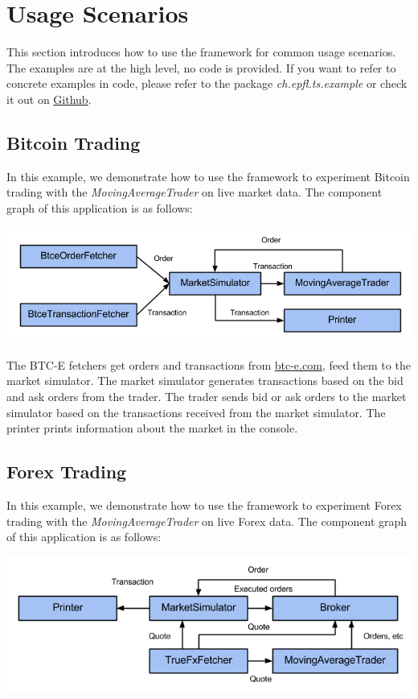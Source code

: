 \section{Usage Scenarios}
\label{sec:3}

This section introduces how to use the framework for common usage scenarios. The examples are at the high level, no code is provided. If you want to refer to concrete examples in code, please refer to the package \emph{ch.epfl.ts.example} or check it out on \href{https://github.com/merlinND/TradingSimulation/tree/master/ts/src/main/scala/ch/epfl/ts/example}{Github}.

\subsection{Bitcoin Trading}

In this example, we demonstrate how to use the framework to experiment Bitcoin trading with the \emph{MovingAverageTrader} on live market data. The component graph of this application is as follows:

\noindent
\includegraphics[width=\textwidth]{img/examples/btce}

The BTC-E fetchers get orders and transactions from \url{btc-e.com}, feed them to the market simulator. The market simulator generates transactions based on the bid and ask orders from the trader. The trader sends bid or ask orders to the market simulator based on the transactions received from the market simulator. The printer prints information about the market in the console.

\subsection{Forex Trading}

In this example, we demonstrate how to use the framework to experiment Forex trading with the \emph{MovingAverageTrader} on live Forex data. The component graph of this application is as follows:

\noindent
\includegraphics[width=\textwidth]{img/examples/forex-live}

